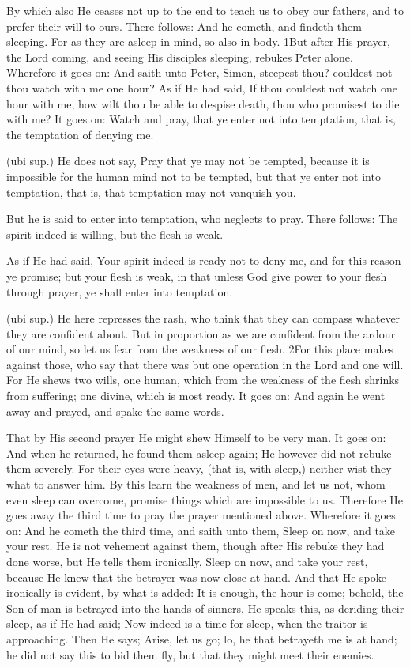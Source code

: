  By which also He ceases not up to the end to teach us to obey our fathers, and to prefer their will to ours. There follows: And he cometh, and findeth them sleeping. For as they are asleep in mind, so also in body. 1But after His prayer, the Lord coming, and seeing His disciples sleeping, rebukes Peter alone. Wherefore it goes on: And saith unto Peter, Simon, steepest thou? couldest not thou watch with me one hour? As if He had said, If thou couldest not watch one hour with me, how wilt thou be able to despise death, thou who promisest to die with me? It goes on: Watch and pray, that ye enter not into temptation, that is, the temptation of denying me.

 (ubi sup.) He does not say, Pray that ye may not be tempted, because it is impossible for the human mind not to be tempted, but that ye enter not into temptation, that is, that temptation may not vanquish you.

 But he is said to enter into temptation, who neglects to pray. There follows: The spirit indeed is willing, but the flesh is weak.

 As if He had said, Your spirit indeed is ready not to deny me, and for this reason ye promise; but your flesh is weak, in that unless God give power to your flesh through prayer, ye shall enter into temptation.

 (ubi sup.) He here represses the rash, who think that they can compass whatever they are confident about. But in proportion as we are confident from the ardour of our mind, so let us fear from the weakness of our flesh. 2For this place makes against those, who say that there was but one operation in the Lord and one will. For He shews two wills, one human, which from the weakness of the flesh shrinks from suffering; one divine, which is most ready. It goes on: And again he went away and prayed, and spake the same words.

 That by His second prayer He might shew Himself to be very man. It goes on: And when he returned, he found them asleep again; He however did not rebuke them severely. For their eyes were heavy, (that is, with sleep,) neither wist they what to answer him. By this learn the weakness of men, and let us not, whom even sleep can overcome, promise things which are impossible to us. Therefore He goes away the third time to pray the prayer mentioned above. Wherefore it goes on: And he cometh the third time, and saith unto them, Sleep on now, and take your rest. He is not vehement against them, though after His rebuke they had done worse, but He tells them ironically, Sleep on now, and take your rest, because He knew that the betrayer was now close at hand. And that He spoke ironically is evident, by what is added: It is enough, the hour is come; behold, the Son of man is betrayed into the hands of sinners. He speaks this, as deriding their sleep, as if He had said; Now indeed is a time for sleep, when the traitor is approaching. Then He says; Arise, let us go; lo, he that betrayeth me is at hand; he did not say this to bid them fly, but that they might meet their enemies.

